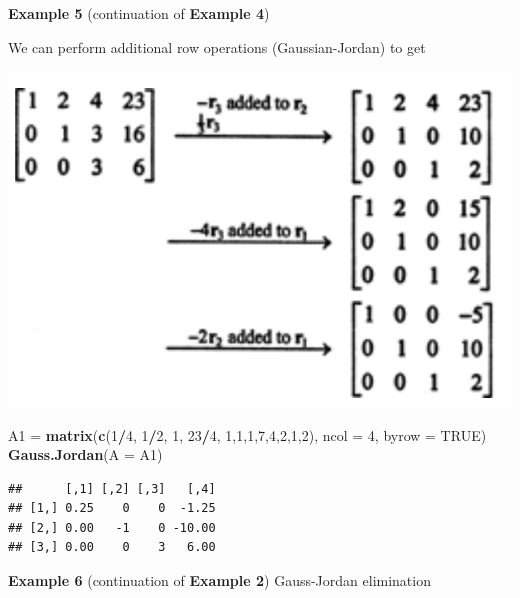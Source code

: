 \documentclass[
]{book}
\newenvironment{Shaded}{\begin{snugshade}}{\end{snugshade}}
\newcommand{\AttributeTok}[1]{\textcolor[rgb]{0.13,0.29,0.53}{#1}}
\newcommand{\ConstantTok}[1]{\textcolor[rgb]{0.56,0.35,0.01}{#1}}
\newcommand{\DecValTok}[1]{\textcolor[rgb]{0.00,0.00,0.81}{#1}}
\newcommand{\FunctionTok}[1]{\textcolor[rgb]{0.13,0.29,0.53}{\textbf{#1}}}
\newcommand{\NormalTok}[1]{#1}
\newcommand{\OtherTok}[1]{\textcolor[rgb]{0.56,0.35,0.01}{#1}}
\newcommand{\SpecialCharTok}[1]{\textcolor[rgb]{0.81,0.36,0.00}{\textbf{#1}}}
\begin{document}
\textbf{Example 5} (continuation of \textbf{Example 4})

We can perform additional row operations (Gaussian-Jordan) to get

\begin{center}\includegraphics[width=0.5\linewidth]{img07/w07-LabExample04-2-sol} \end{center}

\begin{Shaded}
\begin{Highlighting}[]
\NormalTok{A1 }\OtherTok{=} \FunctionTok{matrix}\NormalTok{(}\FunctionTok{c}\NormalTok{(}\DecValTok{1}\SpecialCharTok{/}\DecValTok{4}\NormalTok{, }\DecValTok{1}\SpecialCharTok{/}\DecValTok{2}\NormalTok{, }\DecValTok{1}\NormalTok{, }\DecValTok{23}\SpecialCharTok{/}\DecValTok{4}\NormalTok{, }\DecValTok{1}\NormalTok{,}\DecValTok{1}\NormalTok{,}\DecValTok{1}\NormalTok{,}\DecValTok{7}\NormalTok{,}\DecValTok{4}\NormalTok{,}\DecValTok{2}\NormalTok{,}\DecValTok{1}\NormalTok{,}\DecValTok{2}\NormalTok{), }\AttributeTok{ncol =} \DecValTok{4}\NormalTok{, }\AttributeTok{byrow =} \ConstantTok{TRUE}\NormalTok{)}
\FunctionTok{Gauss.Jordan}\NormalTok{(}\AttributeTok{A =}\NormalTok{ A1)}
\end{Highlighting}
\end{Shaded}

\begin{verbatim}
##      [,1] [,2] [,3]   [,4]
## [1,] 0.25    0    0  -1.25
## [2,] 0.00   -1    0 -10.00
## [3,] 0.00    0    3   6.00
\end{verbatim}

\hfill\break

\textbf{Example 6} (continuation of \textbf{Example 2}) Gauss-Jordan elimination
\end{document}
